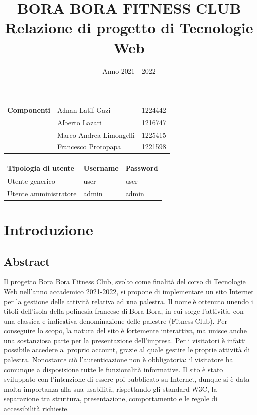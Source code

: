 \documentclass[a4paper]{article}
\title{
	\textbf{BORA BORA FITNESS CLUB}\\
	\large Relazione di progetto di Tecnologie Web
}
\date{Anno 2021 - 2022}
\begin{document}
	\maketitle

	\begin{center}
		\begin{tabular}{c|l l}
			\textbf{Componenti}	& Adnan Latif Gazi			& 1224442\\
								& Alberto Lazari			& 1216747\\
								& Marco Andrea Limongelli	& 1225415\\
								& Francesco Protopapa		& 1221598\\
		\end{tabular}
	\end{center}

	\begin{center}
		\begin{tabular}{|l|l|l|}
			\hline
			\textbf{Tipologia di utente}	& \textbf{Username}	& \textbf{Password}\\
			\hline
			Utente generico					& user				& user\\
			\hline
			Utente amministratore			& admin				& admin\\
			\hline
		\end{tabular}
	\end{center}

	\renewcommand{\contentsname}{Indice}
	\tableofcontents
	\pagebreak

	\section{Introduzione}
	\subsection{Abstract}
	Il progetto Bora Bora Fitness Club, svolto come finalità del corso di Tecnologie Web nell'anno accademico 2021-2022, si propone di implementare un sito Internet per la gestione delle attività relativa ad una palestra. Il nome è ottenuto unendo i titoli dell'isola della polinesia francese di Bora Bora, in cui sorge l'attività, con una classica e indicativa denominazione delle palestre (Fitness Club). Per conseguire lo scopo, la natura del sito è fortemente interattiva, ma unisce anche una sostanziosa parte per la presentazione dell'impresa. Per i visitatori è infatti possibile accedere al proprio account, grazie al quale gestire le proprie attività di palestra. Nonostante ciò l'autenticazione non è obbligatoria: il visitatore ha comunque a disposizione tutte le funzionalità informative. Il sito è stato sviluppato con l'intenzione di essere poi pubblicato su Internet, dunque si è data molta importanza alla sua usabilità, rispettando gli standard W3C, la separazione tra struttura, presentazione, comportamento e le regole di accessibilità richieste.
\end{document}
